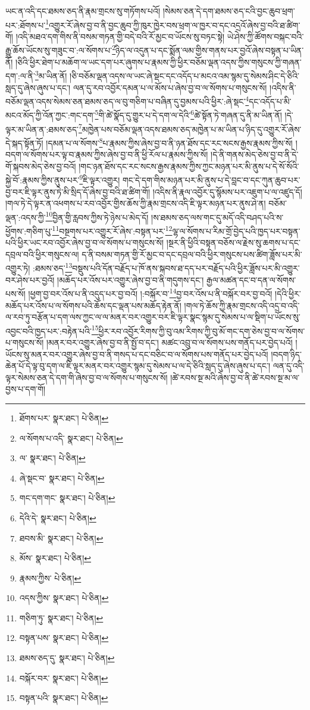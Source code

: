 ཡང་ན་འདི་དང་ཐམས་ཅད་ནི་རྣམ་གྲངས་སུ་གཏོགས་པའོ། །སེམས་ཅན་དེ་དག་ཐམས་ཅད་ངའི་བྱང་ཆུབ་ཕྲག་པར་:ཐོགས་པ་\footnote{ཐོགས་པར་  སྣར་ཐང་།  པེ་ཅིན། }འགྱུར་རོ་ཞེས་བྱ་བ་ནི་བྱང་ཆུབ་ཀྱི་ཁུར་ཁྱེར་བས་ཕྲག་ལ་ཁྱར་བ་དང་འདྲའོ་ཞེས་བྱ་བའི་ཐ་ཚིག་གོ། །འདི་མཐའ་དག་གིས་ནི་བསམ་གཏན་གྱི་བདེ་བའི་རོ་མྱང་བ་ཡོངས་སུ་བཏང་སྟེ། ཡེ་ཤེས་ཀྱི་ཚོགས་བསྐང་བའི་རྒྱུ་ཆོས་ཡོངས་སུ་གཟུང་བ་:ལ་སོགས་པ་\footnote{ལ་སོགས་པ་འདི་  སྣར་ཐང་།  པེ་ཅིན། }ཉིད་ལ་འདུན་པ་དང་སྨོན་ལམ་གྱིས་གནས་པར་བྱའོ་ཞེས་བསྟན་པ་ཡིན་ནོ། །ཅིའི་ཕྱིར་ཐེག་པ་མཆོག་ལ་ཡང་དག་པར་ཞུགས་པ་རྣམས་ཀྱི་ཕྱིར་བཅོམ་ལྡན་འདས་ཀྱིས་གསུངས་ཀྱི་གཞན་དག་:ལ་ནི་\footnote{ལ་  སྣར་ཐང་།  པེ་ཅིན། }མ་ཡིན་ནོ། །ཅི་བཅོམ་ལྡན་འདས་ལ་ཡང་ཞེ་སྡང་དང་འདོད་པ་མངའ་འམ་སྙམ་དུ་སེམས་ཤིང་དེ་ཅིའི་སླད་དུ་ཞེས་ཞུས་པ་དང་། ལན་དུ་རབ་འབྱོར་དམན་པ་ལ་མོས་པ་ཞེས་བྱ་བ་ལ་སོགས་པ་གསུངས་སོ། །འདིས་ནི་བཅོམ་ལྡན་འདས་སེམས་ཅན་ཐམས་ཅད་ལ་བུ་གཅིག་པ་བཞིན་དུ་བྱམས་པའི་ཕྱིར་:ཞེ་སྡང་\footnote{ཞེ་སྡང་བ་  སྣར་ཐང་།  པེ་ཅིན། }དང་འདོད་པ་མི་མངའ་མོད་ཀྱི་འོན་ཀྱང་:གང་དག་\footnote{གང་དག་གང་  སྣར་ཐང་།  པེ་ཅིན། }གི་ཚེ་སྣོད་དུ་གྱུར་པ་དེ་དག་ལ་དེའི་\footnote{དེའི་དེ་  སྣར་ཐང་།  པེ་ཅིན། }ཚེ་སྟོན་ཏེ་གཞན་དུ་ནི་མ་ཡིན་ནོ། །དེ་ལྟར་མ་ཡིན་ན་:ཐམས་ཅད་\footnote{ཐབས་མི་  སྣར་ཐང་།  པེ་ཅིན། }མཁྱེན་པས་བཅོམ་ལྡན་འདས་ཐམས་ཅད་མཁྱེན་པ་མ་ཡིན་པ་ཉིད་དུ་འགྱུར་རོ་ཞེས་དེ་སྐད་སྟོན་ཏོ། །དམན་པ་ལ་སོགས་\footnote{མོས་  སྣར་ཐང་།  པེ་ཅིན། }པ་རྣམས་ཀྱིས་ཞེས་བྱ་བ་ནི་ཉན་ཐོས་དང་རང་སངས་རྒྱས་རྣམས་ཀྱིས་སོ། །བདག་ལ་སོགས་པར་ལྟ་བ་རྣམས་ཀྱིས་ཞེས་བྱ་བ་ནི་ཕྱི་རོལ་པ་རྣམས་ཀྱིས་སོ། །དེ་ནི་གནས་མེད་ཅེས་བྱ་བ་ནི་དེ་གོ་སྐབས་མེད་ཅེས་བྱ་བའོ། །གང་ཉན་ཐོས་དང་རང་སངས་རྒྱས་རྣམས་ཀྱིས་ཀྱང་མཉན་པར་མི་ནུས་པ་དེ་སོ་སོའི་སྐྱེ་བོ་:རྣམས་ཀྱིས་ནུས་པར་\footnote{རྣམས་ཀྱིས་  པེ་ཅིན། }ཇི་ལྟར་འགྱུར། གང་དེ་དག་གིས་མཉན་པར་མི་ནུས་པ་དེ་བླང་བ་དང་ཀུན་ཆུབ་པར་བྱ་བར་ཇི་ལྟར་ནུས་ཏེ་མི་སྲིད་དོ་ཞེས་བྱ་བའི་ཐ་ཚིག་གོ། །འདིས་ནི་རྣལ་འབྱོར་དུ་སྙོམས་པར་འཇུག་པ་ལ་འཛུད་དོ། །གལ་ཏེ་དེ་ལྟར་ན་འཕགས་པ་རབ་འབྱོར་གྱིས་ཆོས་ཀྱི་རྣམ་གྲངས་འདི་ཇི་ལྟར་མཉན་པར་ནུས་ཤེ་ན། བཅོམ་ལྡན་:འདས་ཀྱི་\footnote{འདས་ཀྱིས་  སྣར་ཐང་།  པེ་ཅིན། }བྱིན་གྱི་རླབས་ཀྱིས་ཏེ་ཉེས་པ་མེད་དོ། །ས་ཐམས་ཅད་ལས་གང་དུ་མདོ་འདི་བཤད་པའི་ས་ཕྱོགས་:གཅིག་པུ་\footnote{གཅིག་ཏུ་  སྣར་ཐང་།  པེ་ཅིན། }བསྔགས་པར་འགྱུར་རོ་ཞེས་:བསྟན་པར་\footnote{བསྟན་པས་  སྣར་ཐང་།  པེ་ཅིན། }ལྷ་ལ་སོགས་པ་རིམ་གྲོ་བྱེད་པའི་ཁྱད་པར་བསྟན་པའི་ཕྱིར་ཡང་རབ་འབྱོར་ཞེས་བྱ་བ་ལ་སོགས་པ་གསུངས་སོ། །སྔར་ནི་ཕྱིའི་བསྟན་བཅོས་ལ་རྗེས་སུ་ཆགས་པ་དང་དབྲལ་བའི་ཕྱིར་གསུངས་ལ། ད་ནི་བསམ་གཏན་གྱི་རོ་མྱང་བ་དང་དབྲལ་བའི་ཕྱིར་གསུངས་པས་ཚིག་ཟློས་པར་མི་འགྱུར་ཏེ། :ཐམས་ཅད་\footnote{ཐམས་ཅད་དུ་  སྣར་ཐང་།  པེ་ཅིན། }བསྡུས་པའི་དོན་བརྗོད་པ་ཁོ་ནས་སྐབས་ཐ་དད་པར་བརྗོད་པའི་ཕྱིར་ཟློས་པར་མི་འགྱུར་བར་ཤེས་པར་བྱའོ། །མཆོད་པར་འོས་པར་འགྱུར་ཞེས་བྱ་བ་ནི་གདུགས་དང་། རྒྱལ་མཚན་དང་བ་དན་ལ་སོགས་པས་སོ། །ཕྱག་བྱ་བར་འོས་པ་ནི་འདུད་པར་བྱ་བའོ། །:བསྐོར་བ་\footnote{བསྐོར་བར་  སྣར་ཐང་།  པེ་ཅིན། }བྱ་བར་འོས་པ་ནི་བསྐོར་བར་བྱ་བའོ། །དེའི་ཕྱིར་མཆོད་པར་འོས་པ་ལ་སོགས་པའི་ཆོས་དང་ལྡན་པས་མཆོད་རྟེན་ནོ། །གལ་ཏེ་ཆོས་ཀྱི་རྣམ་གྲངས་འདི་འདྲ་བ་འདི་ལ་རབ་ཏུ་བརྩོན་པ་དག་ལས་ཀྱང་ལ་ལ་མནར་བར་འགྱུར་བར་ཇི་ལྟར་སྣང་སྙམ་དུ་སེམས་པ་ལ་སྡིག་པ་ཡོངས་སུ་འབྱང་བའི་ཁྱད་པར་:བརྟེན་པའི་\footnote{བསྟན་པའི་  སྣར་ཐང་།  པེ་ཅིན། }ཕྱིར་རབ་འབྱོར་རིགས་ཀྱི་བུ་འམ་རིགས་ཀྱི་བུ་མོ་གང་དག་ཅེས་བྱ་བ་ལ་སོགས་པ་གསུངས་སོ། །མནར་བར་འགྱུར་ཞེས་བྱ་བ་ནི་སྤྱོ་བ་དང་། མཚང་འབྲུ་བ་ལ་སོགས་པས་གནོད་པར་བྱེད་པའོ། །ཡོངས་སུ་མནར་བར་འགྱུར་ཞེས་བྱ་བ་ནི་གསད་པ་དང་བཅིང་བ་ལ་སོགས་པས་གནོད་པར་བྱེད་པའོ། །བདག་ཉིད་ཆེན་པོ་དེ་ལྟ་བུ་དག་ལ་ཇི་ལྟར་མནར་བར་འགྱུར་སྙམ་དུ་སེམས་པ་ལ་དེ་ཅིའི་སླད་དུ་ཞེས་ཞུས་པ་དང་། ལན་དུ་འདི་ལྟར་སེམས་ཅན་དེ་དག་གི་ཞེས་བྱ་བ་ལ་སོགས་པ་གསུངས་སོ། །ཚེ་རབས་སྔ་མའི་ཞེས་བྱ་བ་ནི་ཚེ་རབས་སྔ་མ་ལ་བྱས་པ་དག་གོ། 